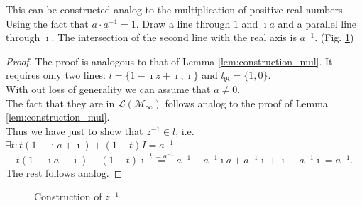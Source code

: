 This can be constructed analog to the multiplication of positive real numbers. 
Using the fact that $a\cdot a^{-1} = 1$.
Draw a line through $1$ and $\imath a$ and a parallel line through $\imath$. 
The intersection of the second line with the real axis is $a^{-1}$. (Fig. \ref{Fig.6})
\begin{proof}
    \leanok
    The proof is analogous to that of Lemma \ref{lem:construction_mul}. It requires only two lines: $l = \{1 - \imath z + \imath, \imath\}$ and $l_{\Re} = \{1,0\}$.\\
    With  out loss of generality we can assume that $a \ne 0$.\\
    The fact that they are in $\mathcal{L(M_{\infty})}$ follows analog to the proof of Lemma \ref{lem:construction_mul}.\\ 
    Thus we have just to show that $z^{-1} \in l$, i.e. $\exists t: t  (1 - \imath a + \imath) + (1 - t)  I = a^{-1}$ $$t  (1 - \imath a + \imath) + (1 - t)  \imath \stackrel{t:=a^{-1}}{=}  a^{-1} - a^{-1} \imath a + a^{-1}\imath + \imath - a^{-1}\imath = a^{-1}.$$
    The rest follows analog.
\end{proof}
\begin{figure}
    \centering
    \caption{Construction of $z^{-1}$}
    \label{Fig.6}
\end{figure}

